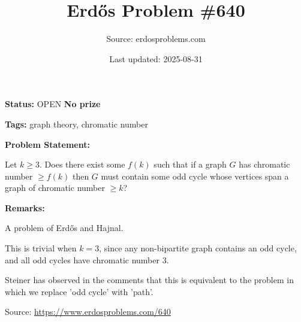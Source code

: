 \documentclass{article}
\title{Erd\H{o}s Problem \#640}
\date{Last updated: 2025-08-31}
\author{Source: erdosproblems.com}
\begin{document}
\maketitle

\noindent\textbf{Status:} OPEN \quad \textbf{No prize}

\noindent\textbf{Tags:} graph theory, chromatic number

\medskip
\noindent\textbf{Problem Statement:}

Let $k\geq 3$. Does there exist some $f(k)$ such that if a graph $G$ has chromatic number $\geq f(k)$ then $G$ must contain some odd cycle whose vertices span a graph of chromatic number $\geq k$?

\bigskip
\noindent\textbf{Remarks:}

A problem of Erd\H{o}s and Hajnal. 

This is trivial when $k=3$, since any non-bipartite graph contains an odd cycle, and all odd cycles have chromatic number $3$.

Steiner has observed in the comments that this is equivalent to the problem in which we replace 'odd cycle' with 'path'.

\bigskip
\noindent\small{Source: \url{https://www.erdosproblems.com/640}}
\end{document}
